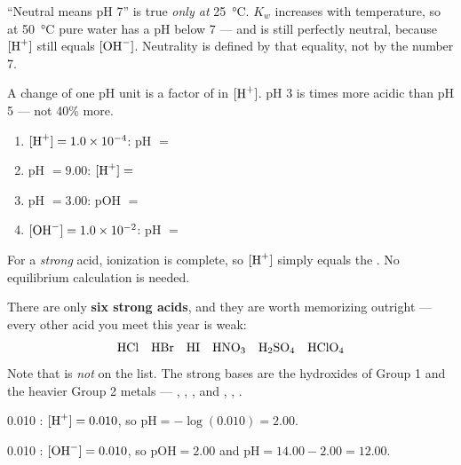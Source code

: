 \documentclass{apchem-notes}
\begin{document}
\begin{apctrap}
``Neutral means pH 7'' is true \emph{only at} \SI{25}{\celsius}. $K_w$
increases with temperature, so at \SI{50}{\celsius} pure water has a pH
below 7 --- and is still perfectly neutral, because $[\ce{H+}]$ still equals
$[\ce{OH-}]$. Neutrality is defined by that equality, not by the number 7.
\end{apctrap}


A change of one pH unit is a factor of  in
$[\ce{H+}]$. pH 3 is  times more acidic than pH 5 ---
not 40\% more.


\begin{enumerate}[leftmargin=*,itemsep=0.3em]
  \item $[\ce{H+}] = 1.0\times10^{-4}$: pH $=$ 
  \item pH $= 9.00$: $[\ce{H+}] =$
  \item pH $= 3.00$: pOH $=$ 
  \item $[\ce{OH-}] = 1.0\times10^{-2}$: pH $=$
\end{enumerate}



For a \emph{strong} acid, ionization is complete, so
$[\ce{H+}]$ simply equals the . No
equilibrium calculation is needed.

There are only \textbf{six strong acids}, and they are worth memorizing
outright --- every other acid you meet this year is weak:
\[ \ce{HCl} \quad \ce{HBr} \quad \ce{HI} \quad \ce{HNO3} \quad
   \ce{H2SO4} \quad \ce{HClO4} \]
Note that  is \emph{not} on the list. The strong bases are the
hydroxides of Group 1 and the heavier Group 2 metals ---
, , , and , ,
.

\begin{workedexample}
\SI{0.010}{\Molar} : $[\ce{H+}] = 0.010$, so
$\mathrm{pH} = -\log(0.010) = \mathbf{2.00}$.

\SI{0.010}{\Molar} : $[\ce{OH-}] = 0.010$, so
$\mathrm{pOH} = 2.00$ and $\mathrm{pH} = 14.00 - 2.00 = \mathbf{12.00}$.
\end{workedexample}
\end{document}
